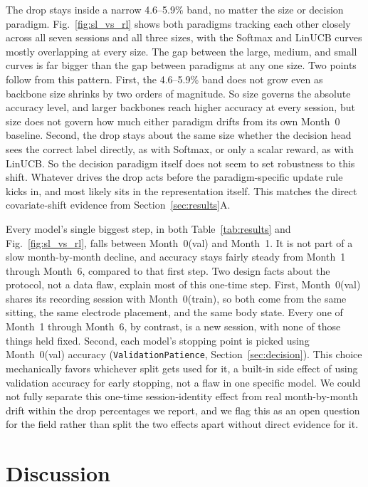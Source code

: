 \documentclass[journal]{IEEEtran}
\begin{document}
The drop stays inside a narrow 4.6--5.9\% band, no matter the size or decision paradigm. Fig.~\ref{fig:sl_vs_rl} shows both paradigms tracking each other closely across all seven sessions and all three sizes, with the Softmax and LinUCB curves mostly overlapping at every size. The gap between the large, medium, and small curves is far bigger than the gap between paradigms at any one size. Two points follow from this pattern. First, the 4.6--5.9\% band does not grow even as backbone size shrinks by two orders of magnitude. So size governs the absolute accuracy level, and larger backbones reach higher accuracy at every session, but size does not govern how much either paradigm drifts from its own Month~0 baseline. Second, the drop stays about the same size whether the decision head sees the correct label directly, as with Softmax, or only a scalar reward, as with LinUCB. So the decision paradigm itself does not seem to set robustness to this shift. Whatever drives the drop acts before the paradigm-specific update rule kicks in, and most likely sits in the representation itself. This matches the direct covariate-shift evidence from Section~\ref{sec:results}A.

Every model's single biggest step, in both Table~\ref{tab:results} and Fig.~\ref{fig:sl_vs_rl}, falls between Month~0(val) and Month~1. It is not part of a slow month-by-month decline, and accuracy stays fairly steady from Month~1 through Month~6, compared to that first step. Two design facts about the protocol, not a data flaw, explain most of this one-time step. First, Month~0(val) shares its recording session with Month~0(train), so both come from the same sitting, the same electrode placement, and the same body state. Every one of Month~1 through Month~6, by contrast, is a new session, with none of those things held fixed. Second, each model's stopping point is picked using Month~0(val) accuracy (\texttt{ValidationPatience}, Section~\ref{sec:decision}). This choice mechanically favors whichever split gets used for it, a built-in side effect of using validation accuracy for early stopping, not a flaw in one specific model. We could not fully separate this one-time session-identity effect from real month-by-month drift within the drop percentages we report, and we flag this as an open question for the field rather than split the two effects apart without direct evidence for it.

\section{Discussion}
\label{sec:discussion}
\end{document}
